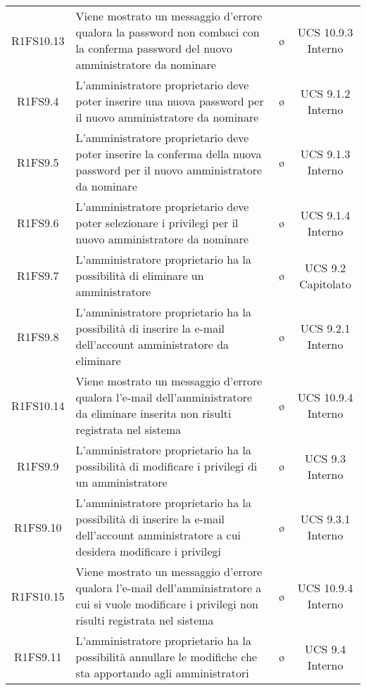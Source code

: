 {\begin{longtable}{ c C{8cm} c c}
R1FS10.13 & Viene mostrato un messaggio d'errore qualora la password non combaci con la conferma password del nuovo amministratore da nominare & \o & UCS 10.9.3 Interno\\

R1FS9.4 & L'amministratore proprietario deve poter inserire una nuova password per il nuovo amministratore da nominare & \o & UCS 9.1.2 Interno\\

R1FS9.5 & L'amministratore proprietario deve poter inserire la conferma della nuova password per il nuovo amministratore da nominare & \o & UCS 9.1.3 Interno\\

R1FS9.6 & L'amministratore proprietario deve poter selezionare i privilegi per il nuovo amministratore da nominare & \o & UCS 9.1.4 Interno\\

R1FS9.7 & L'amministratore proprietario ha la possibilità di eliminare un amministratore & \o & UCS 9.2 Capitolato\\

R1FS9.8 & L'amministratore proprietario ha la possibilità di inserire la e-mail dell'account amministratore da eliminare & \o & UCS 9.2.1 Interno\\

R1FS10.14 & Viene mostrato un messaggio d'errore qualora l'e-mail dell'amministratore da eliminare inserita non risulti registrata nel sistema & \o & UCS 10.9.4 Interno\\

R1FS9.9 & L'amministratore proprietario ha la possibilità di modificare i privilegi di un amministratore & \o & UCS 9.3 Interno\\

R1FS9.10 & L'amministratore proprietario ha la possibilità di inserire la e-mail dell'account amministratore a cui desidera modificare i privilegi & \o & UCS 9.3.1 Interno\\

R1FS10.15 & Viene mostrato un messaggio d'errore qualora l'e-mail dell'amministratore a cui si vuole modificare i privilegi non risulti registrata nel sistema & \o & UCS 10.9.4 Interno\\

R1FS9.11 & L'amministratore proprietario ha la possibilità annullare le modifiche che sta apportando agli amministratori & \o & UCS 9.4 Interno\\

\end{longtable}
}